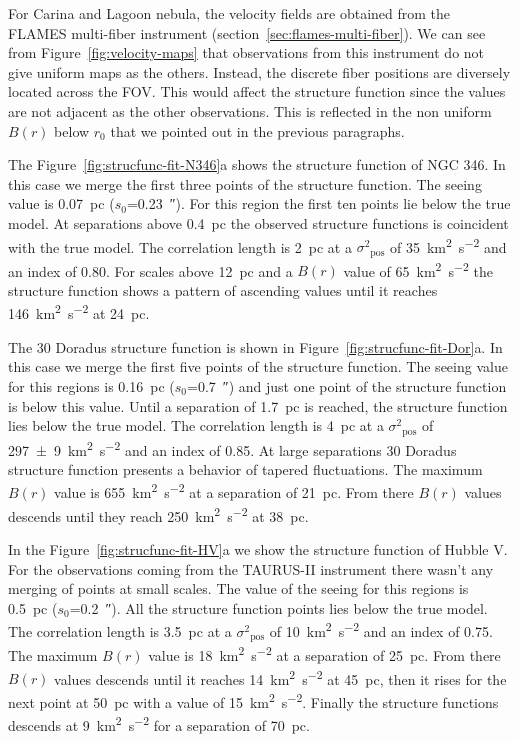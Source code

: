 \documentclass[fleqn,usenatbib, useAMS, a4paper]{mnras}
\newcommand\pos{\ensuremath{_{\mathrm{pos}}}}
\begin{document}
For Carina and Lagoon nebula, the velocity fields are obtained from the FLAMES multi-fiber instrument (section~\ref{sec:flames-multi-fiber}). 
We can see from Figure~\ref{fig:velocity-maps} that observations from this instrument do not give uniform maps as the others. 
Instead, the discrete fiber positions are diversely located across the FOV.
This would affect the structure function since the values are not adjacent as the other observations.
This is reflected in the non uniform \(B(r)\) below  \(r_0\) that we pointed out in the previous paragraphs.

The Figure~\ref{fig:strucfunc-fit-N346}a shows the structure function of NGC 346.
In this case we merge the first three points of the structure function.
The seeing value is \SI{0.07}{pc} (\(s_0\)=\SI{0.23}{\arcsecond}).
For this region the first ten points lie below the true model.
At separations above \SI{0.4}{pc} the observed structure functions is coincident with the true model. 
The correlation length is \SI{2}{pc} at a \(\sigma^2\pos\) of \SI{35}{km^{2}.s^{-2}} and an index of \num{0.80}.
For scales above \SI{12}{pc} and a \(B(r)\) value of \SI{65}{km^{2}.s^{-2}} the structure function shows a pattern of ascending values until it reaches \SI{146}{km^{2}.s^{-2}} at \SI{24}{pc}.  

The 30 Doradus structure function is shown in Figure~\ref{fig:strucfunc-fit-Dor}a.
In this case we merge the first five points of the structure function.
The seeing value for this regions is \SI{0.16}{pc} (\(s_0\)=\SI{0.7}{\arcsecond}) and just one point of the structure function is below this value.
Until a separation of \SI{1.7}{pc} is reached, the structure function lies below the true model.
The correlation length is \SI{4}{pc} at a \(\sigma^2\pos\) of \SI{297 \pm 9}{km^{2}.s^{-2}} and an index of \num{0.85}.
At large separations 30 Doradus structure function presents a behavior of tapered fluctuations.  
The maximum \(B(r)\) value is \SI{655}{km^{2}.s^{-2}} at a separation of \SI{21}{pc}. 
From there \(B(r)\) values descends until they reach \SI{250}{km^{2}.s^{-2}} at \SI{38}{pc}.

In the Figure~\ref{fig:strucfunc-fit-HV}a we show the structure function of Hubble V.
For the observations coming from the TAURUS-II instrument there wasn't any merging of points at small scales.
The value of the seeing for this regions is \SI{0.5}{pc} (\(s_0\)=\SI{0.2}{\arcsecond}).
All the structure function points lies below the true model.
The correlation length is \SI{3.5}{pc} at a \(\sigma^2\pos\) of  \SI{10}{km^{2}.s^{-2}} and an index of \num{0.75}.
The maximum \(B(r)\) value is \SI{18}{km^{2}.s^{-2}} at a separation of \SI{25}{pc}. 
From there \(B(r)\) values descends until it reaches \SI{14}{km^{2}.s^{-2}} at \SI{45}{pc}, then it rises for the next point at \SI{50}{pc} with a value of \SI{15}{km^{2}.s^{-2}}.
Finally the structure functions descends at \SI{9}{km^{2}.s^{-2}} for a separation of \SI{70}{pc}.
\end{document}
